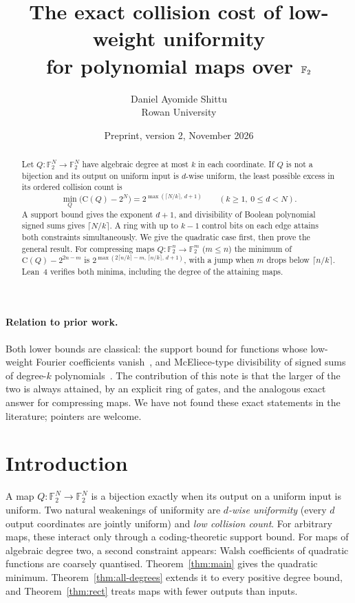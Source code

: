 \documentclass[11pt]{article}
\title{The exact collision cost of low-weight uniformity\\ for polynomial maps over $\F$}
\author{Daniel Ayomide Shittu\\ {\small Rowan University}}
\date{Preprint, version 2, November 2026}
\theoremstyle{definition}
\theoremstyle{remark}
\newcommand{\F}{\mathbb{F}_2}
\newcommand{\Coll}{\mathrm{C}}
\begin{document}
\maketitle

\begin{abstract}
Let $Q\colon\F^N\to\F^N$ have algebraic degree at most $k$ in each
coordinate. If $Q$ is not a bijection and its output on uniform input is
$d$-wise uniform, the least possible excess in its ordered collision count is
\[
  \min_Q\bigl(\Coll(Q)-2^N\bigr)
    =2^{\max(\lceil N/k\rceil,\,d+1)}
    \qquad(k\ge1,\ 0\le d<N).
\]
A support bound gives the exponent $d+1$, and divisibility of Boolean
polynomial signed sums gives $\lceil N/k\rceil$. A ring with up to $k-1$
control bits on each edge attains both constraints simultaneously. We give
the quadratic case first, then prove the general result. For compressing
maps $Q\colon\F^n\to\F^m$ ($m\le n$) the minimum of $\Coll(Q)-2^{2n-m}$ is
$2^{\max(2\lceil n/k\rceil-m,\,\lceil n/k\rceil,\,d+1)}$, with a jump when $m$
drops below $\lceil n/k\rceil$. Lean~4 verifies both minima, including the
degree of the attaining maps.
\end{abstract}

\paragraph{Relation to prior work.}
Both lower bounds are classical: the support bound for functions whose
low-weight Fourier coefficients vanish~\cite{Delsarte73,MacWilliamsSloane}, and
McEliece-type divisibility of signed sums of degree-$k$
polynomials~\cite{McEliece72}. The contribution of this note is that the larger
of the two is always attained, by an explicit ring of gates, and the analogous
exact answer for compressing maps. We have not found these exact statements in
the literature; pointers are welcome.

\section{Introduction}

A map $Q\colon\F^N\to\F^N$ is a bijection exactly when its output on a uniform
input is uniform. Two natural weakenings of uniformity are \emph{$d$-wise
uniformity} (every $d$ output coordinates are jointly uniform) and \emph{low
collision count}. For arbitrary maps, these interact only through a
coding-theoretic support bound. For maps of algebraic degree two, a second
constraint appears: Walsh coefficients of quadratic functions are coarsely
quantised. Theorem~\ref{thm:main} gives the quadratic minimum. Theorem~\ref{thm:all-degrees} extends it to every positive degree bound, and Theorem~\ref{thm:rect} treats maps with fewer outputs than inputs.
\end{document}
